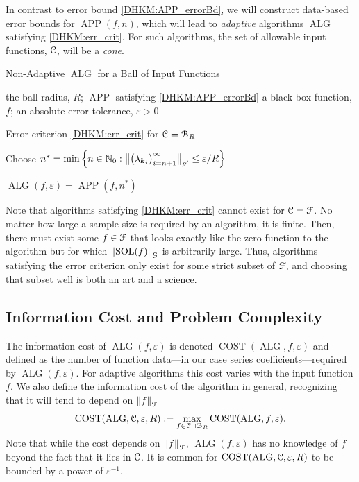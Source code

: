 \documentclass[USenglish]{article}
\theoremstyle{dgthm}
\theoremstyle{dgthm}
\theoremstyle{dgthm}
\theoremstyle{dgthm}
\theoremstyle{dgdef}
\DeclareMathOperator{\SOL}{SOL}
\DeclareMathOperator{\APP}{APP}
\DeclareMathOperator{\ALG}{ALG}
\DeclareMathOperator{\COST}{COST}
\newcommand{\norm}[2][{}]{\ensuremath{\left \lVert #2 \right \rVert}_{#1}}
\newcommand{\bignorm}[2][{}]{\ensuremath{\bigl \lVert #2 \bigr \rVert}_{#1}}
\begin{document}
In contrast to error bound \eqref{DHKM:APP_errorBd}, we will construct data-based error bounds for $\APP(f,n)$, which will lead to \emph{adaptive} algorithms $\ALG$ satisfying \eqref{DHKM:err_crit}.  For such algorithms, the set of allowable input functions, ${\mathcal{C}}$, will be a \emph{cone}.

\begin{algorithm}
	\caption{Non-Adaptive $\ALG$ for a Ball of Input Functions} \label{DHKM:BallAlg}
	\begin{algorithmic}
	\PARAM the ball radius, $R$; $\APP$ satisfying \eqref{DHKM:APP_errorBd}
	\INPUT a black-box function, $f$; an absolute error tolerance, $\varepsilon>0$

    \Ensure Error criterion \eqref{DHKM:err_crit} for ${\mathcal{C}} = {\mathcal{B}}_{R}$

    \State Choose $n^* =  \min \left \{n \in \N_0 : \bignorm[\rho']{\bigl(  \lambda_{\bsk_i}  \bigr)_{i = n+1}^{\infty}} \le \varepsilon /R \right \}$

    \RETURN $\ALG(f,\varepsilon) = \APP(f,n^*)$
\end{algorithmic}
\end{algorithm}

Note that algorithms satisfying \eqref{DHKM:err_crit} cannot exist for ${\mathcal{C}} = {\mathcal{F}}$. No matter how large a sample size is required by an algorithm, it is finite.  Then, there must exist some $f \in {\mathcal{F}}$ that looks exactly like the zero function to the algorithm but for which $\norm[\calG]{\SOL(f)}$ is arbitrarily large.  Thus, algorithms satisfying the error criterion only exist for some strict subset of ${\mathcal{F}}$, and choosing that subset well is both an art and a science.


\subsection{Information Cost and Problem Complexity}

The information cost of $\ALG(f,\varepsilon)$ is denoted $\COST(\ALG,f,\varepsilon)$ and defined as the number of function data---in our case series coefficients---required by $\ALG(f,\varepsilon)$.  For adaptive algorithms this cost varies with the input function $f$.  We also define the information cost of the algorithm in general, recognizing that it will tend to depend on $\norm[\calF]{f}$
\begin{equation*}
    \COST(\ALG, \calC, \varepsilon,R) : = \max_{f \in \calC \cap \calB_{R}} \COST(\ALG,f,\varepsilon).
\end{equation*}
Note that while the cost depends on $\norm[\calF]{f}$, $\ALG(f,\varepsilon)$ has no knowledge of $f$ beyond the fact that it lies in ${\mathcal{C}}$.  It is common for $\COST(\ALG, \calC, \varepsilon,R)$ to be bounded by a power of $\varepsilon^{-1}$.
\end{document}
